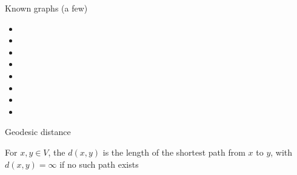 \documentclass[aspectratio=169]{beamer}\usepackage[]{graphicx}\usepackage[]{xcolor}
\begin{document}
\begin{frame}{Known graphs (a few)}
	\begin{itemize}
		\item {}
		\item {}
		\item {}
		\item {}
		\item {}
		\item {}
		\item {}
		\item {}
	\end{itemize}
\end{frame}






\begin{frame}{Geodesic distance}
\begin{definition}
For $x,y\in V$, the  $d(x,y)$ is the length of the shortest path from $x$ to $y$, with $d(x,y)=\infty$ if no such path exists
\end{definition}
\end{frame}
\end{document}
